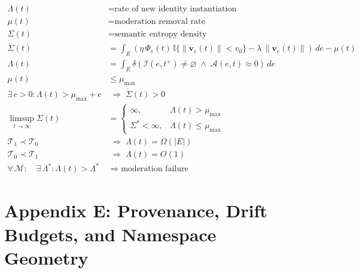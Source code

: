 \documentclass[11pt,oneside]{article}
\begin{document}
\begin{align}
\Lambda(t) &= \text{rate of new identity instantiation} \\[6pt]
\mu(t) &= \text{moderation removal rate} \\[6pt]
\Sigma(t) &= \text{semantic entropy density} \\[10pt]

\dot{\Sigma}(t)
&= \int_E
\left(
\eta\,\Phi_e(t)\,\mathbb{I}\{\|\mathbf{v}_e(t)\| < v_0\}
- \lambda\,\|\mathbf{v}_e(t)\|
\right)
\,de
- \mu(t)
\\[12pt]

\Lambda(t)
&= \int_E
\delta\!\left(
\mathcal{I}(e,t^+) \neq \varnothing \;\wedge\; \mathcal{A}(e,t) \approx 0
\right)
\,de
\\[12pt]

\mu(t)
&\le \mu_{\max}
\\[10pt]

\exists\, c > 0 :
\Lambda(t) > \mu_{\max} + c
&\;\Longrightarrow\;
\dot{\Sigma}(t) > 0
\\[12pt]

\limsup_{t \to \infty} \Sigma(t)
&=
\begin{cases}
\infty, & \Lambda(t) > \mu_{\max} \\[6pt]
\Sigma^\ast < \infty, & \Lambda(t) \le \mu_{\max}
\end{cases}
\\[14pt]

\mathcal{T}_1 \prec \mathcal{T}_0
&\;\Longrightarrow\;
\Lambda(t) = \Omega(|E|)
\\[10pt]

\mathcal{T}_0 \prec \mathcal{T}_1
&\;\Longrightarrow\;
\Lambda(t) = O(1)
\\[12pt]

\forall\, \mathcal{M} :
\quad
\exists\, \Lambda^\ast :
\Lambda(t) > \Lambda^\ast
&\;\Rightarrow\;
\text{moderation failure}
\end{align}

\section{Appendix E: Provenance, Drift Budgets, and Namespace Geometry}
\end{document}
